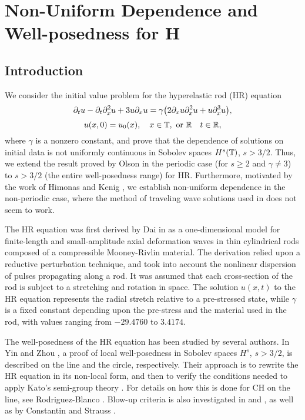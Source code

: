 \chapter{Non-Uniform Dependence and Well-posedness for 
H}
\section{Introduction}
%
We consider the  initial value problem for
the hyperelastic rod (HR)  equation
%
%
\begin{equation}
\label{hr}
\partial_t u
-
\partial_t \partial_x^2 u
+
3u\partial_x u
=
\gamma \big (
2\partial_x u \partial_x^2 u
+
u \partial_x^3 u
\big ),
\end{equation}
%
%
%
%
\begin{equation}
\label{hr-data} u(x, 0) = u_0 (x),
\quad x \in \mathbb{T}, \ \text{or} \ \mathbb{R} \quad t \in \mathbb{R},
\end{equation}
%
%
where  $\gamma$  is a  nonzero constant,
and prove that the dependence of solutions on initial data is not uniformly 
continuous in Sobolev spaces $H^s(\mathbb{T})$, $s>3/2$.
Thus, we extend the result proved by Olson 
\cite{Olson_2006_Non-uniform-dep} in the periodic
case (for $s\ge 2$ and $\gamma \ne 3$)  to  $s>3/2$ (the entire 
well-posedness range) for HR\@. Furthermore,  motivated by the work of
Himonas  and Kenig \cite{Himonas:2009fk},
we establish non-uniform dependence
in the non-periodic case, where the method of traveling wave solutions used in  
\cite{Olson_2006_Non-uniform-dep} does not seem to work.
%
%

The HR equation was first
derived by Dai in \cite{Dai_1998_Model-equations} as a one-dimensional 
model for finite-length and
small-amplitude axial deformation waves in thin cylindrical
rods composed of a compressible Mooney-Rivlin
material. The derivation relied upon a reductive perturbation technique, 
and took into account the nonlinear dispersion of pulses propagating 
along a rod. It was assumed that each cross-section of the rod is 
subject to a stretching and rotation in space. The solution $u(x,t)$ to the 
HR equation represents the radial stretch relative
to a pre-stressed state, while $\gamma$ is a fixed constant depending upon 
the pre-stress and the material used in
the rod, with values ranging from $- 29.4760$ to $3.4174$.

%
The well-posedness of the HR equation has been studied by several authors. 
In Yin \cite{Yin_2003_On-the-Cauchy-p} and Zhou 
\cite{Zhou_2005_Local-well-pose}, a proof of local well-posedness in Sobolev 
spaces $H^s$,  $s > 3/2$, is described  on the line and the circle, respectively. 
Their approach is to rewrite the HR equation   
in its non-local form, and then to verify the conditions needed to apply 
Kato's semi-group theory \cite{Kato_1975_Quasi-linear-eq}. 
For details on how this is done for CH on the line, see Rodriguez-Blanco 
\cite{Rodriguez-Blanco_2001_On-the-Cauchy-p}. Blow-up criteria 
is also investigated in \cite{Yin_2003_On-the-Cauchy-p} and 
\cite{Zhou_2005_Local-well-pose}, as well as by Constantin and Strauss 
\cite{Constantin_2000_Stability-of-a-}. 


